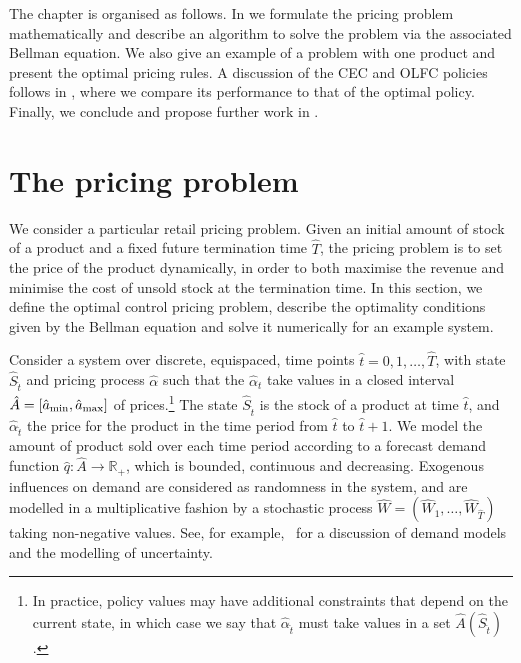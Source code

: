 \documentclass[main.tex]{subfiles}
\begin{document}
The chapter is organised as follows.
In  we formulate the
pricing problem mathematically and describe an algorithm to solve the
problem via the associated Bellman equation. We also give an example
of a problem with one product and present the optimal pricing rules.
A discussion of the CEC and OLFC policies follows in
, where we compare its
performance to that of
the optimal policy.
Finally, we conclude and propose further work in .


\section{The pricing problem}\label{sec:bellman_optimal_control}
We  consider a particular retail pricing problem.
Given an initial amount of stock of a product and a fixed future
termination time $\hat{T}$,
the pricing problem is to
set the price
of the product dynamically, in order to both maximise the revenue and minimise the cost of
unsold stock at the termination time.
In this section, we define the optimal control pricing problem,
describe the optimality conditions given by the Bellman equation and
solve it numerically for an example system.

Consider a system over discrete, equispaced, time points
$\hat{t}=0,1,\dots,\hat{T}$, with state
$\hat{S}_{\hat{t}}$ and pricing process $\hat{\alpha}$ such that the $\hat{\alpha}_t$ take values in a closed
interval $\hat{A}=\nobreak[\hat{a}_{\mathrm{min}},\hat{a}_{\mathrm{max}}]$ of prices.\footnote{In
  practice, policy values may have additional constraints that depend
  on the current state,
  in which case we say that $\hat{\alpha}_{\hat{t}}$ must take values
  in a set $\hat{A}(\hat{S}_{\hat{t}})$.
}
The state $\hat{S}_{\hat{t}}$ is the stock of a product at time $\hat{t}$, and
$\hat{\alpha}_{\hat{t}}$ the price for the product in the time period from $\hat{t}$ to
$\hat{t}+1$. We model the amount of product sold over each time period according
to a forecast demand
function $\hat{q}:\hat{A}\to\mathbb{R}_+$, which is bounded, continuous and decreasing.
Exogenous influences on demand are considered as randomness in the
system, and are
modelled in a multiplicative fashion by a stochastic process
$\hat{W}=(\hat{W}_1,\dots,\hat{W}_{\hat{T}})$ taking non-negative values. See, for
example,~\citet[Ch.~7]{talluri2006theory} for a discussion of
demand models and the modelling of uncertainty.
\end{document}
